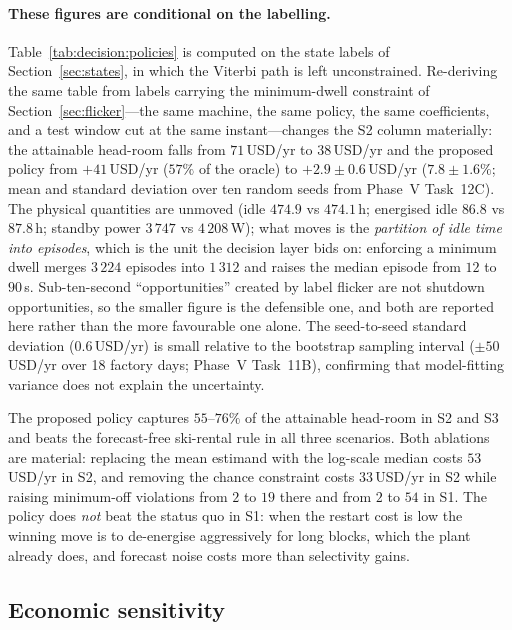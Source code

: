 \paragraph{These figures are conditional on the labelling.}
Table~\ref{tab:decision:policies} is computed on the state labels of
Section~\ref{sec:states}, in which the Viterbi path is left
unconstrained. Re-deriving the same table from labels carrying the
minimum-dwell constraint of Section~\ref{sec:flicker}---the same
machine, the same policy, the same coefficients, and a test window cut
at the same instant---changes the S2 column materially: the attainable
head-room falls from $71$\,USD/yr to $38$\,USD/yr and the proposed
policy from $+41$\,USD/yr ($57\%$ of the oracle) to
$+2.9 \pm 0.6$\,USD/yr ($7.8 \pm 1.6\%$; mean and standard deviation
over ten random seeds from Phase~V Task~12C). The physical quantities
are unmoved (idle $474.9$ vs $474.1$\,h; energised idle $86.8$ vs
$87.8$\,h; standby power $3\,747$ vs $4\,208$\,W); what moves is the
\emph{partition of idle time into episodes}, which is the unit the
decision layer bids on: enforcing a minimum dwell merges $3\,224$
episodes into $1\,312$ and raises the median episode from $12$ to
$90$\,s. Sub-ten-second ``opportunities'' created by label flicker are
not shutdown opportunities, so the smaller figure is the defensible
one, and both are reported here rather than the more favourable one
alone. The seed-to-seed standard deviation ($0.6$\,USD/yr) is small
relative to the bootstrap sampling interval ($\pm 50$\,USD/yr over
18 factory days; Phase~V Task~11B), confirming that model-fitting
variance does not explain the uncertainty.

The proposed policy captures $55$--$76\%$ of the attainable head-room in
S2 and S3 and beats the forecast-free ski-rental rule in all three
scenarios. Both ablations are material: replacing the mean estimand with
the log-scale median costs $53$\,USD/yr in S2, and removing the chance
constraint costs $33$\,USD/yr in S2 while raising minimum-off violations
from $2$ to $19$ there and from $2$ to $54$ in S1. The policy does
\emph{not} beat the status quo in S1: when the
restart cost is low the winning move is to de-energise aggressively for
long blocks, which the plant already does, and forecast noise costs more
than selectivity gains.

\subsection{Economic sensitivity}
\label{sec:decision:sensitivity}


